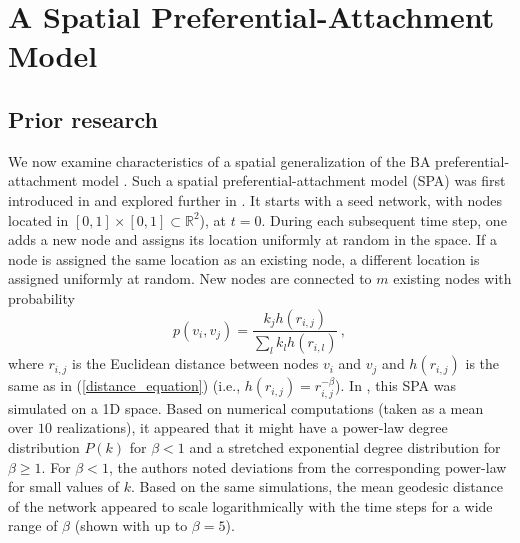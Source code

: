 \documentclass[%
 reprint,
 amsmath,amssymb,
 aps,
]{revtex4-1}
\begin{document}


\section{A Spatial Preferential-Attachment Model} \label{sec:ba-model}

\subsection{Prior research} \label{prior}

We now examine characteristics of a spatial generalization of the BA preferential-attachment model \cite{BA}. Such a spatial preferential-attachment model (SPA) was first introduced in \cite{SPA1} and explored further in \cite{SPA2, SPA3, SPA4}. 
It starts with a seed network, with nodes located in $[0, 1] \times [0, 1] \subset \mathbb{R}^2$), at $t=0$. During each subsequent time step, one adds a new node and assigns its location
uniformly at random in the space. {\color{red}If a node is assigned the same location as an existing node, a different location is assigned uniformly at random.} New nodes are connected to $m$ existing nodes with probability 
\begin{equation}\label{spatialpreferential_prior}
    p(v_i,v_j) = \frac{k_j h(r_{i, j})}{\sum_l k_l h(r_{i,l})}\,,
\end{equation}
where $r_{i,j}$ is the Euclidean distance between nodes $v_i$ and $v_j$ and $h(r_{i,j})$ is the same as in (\ref{distance_equation}) (i.e., $h(r_{i,j}) = r_{i,j}^{-\beta}$). In \cite{SPA1}, this SPA was simulated on a 1D space. {\color{red} Based on numerical computations (taken as a mean over $10$ realizations), it appeared that it might have a power-law degree distribution $P(k)$ for $\beta < 1$ and a stretched exponential degree distribution for $\beta \geq 1$. For $\beta < 1$, the authors noted deviations from the corresponding power-law for small values of $k$. Based on the same simulations, the mean geodesic distance of the network appeared to scale logarithmically with the time steps for a wide range of $\beta$ (shown with up to $\beta = 5$). }
\end{document}
